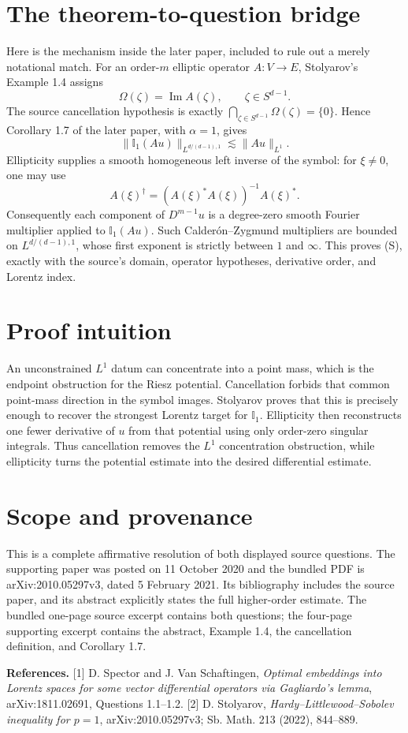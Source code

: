 \documentclass[11pt]{article}
\newcommand{\I}{\mathbb I}
\begin{document}
\section*{The theorem-to-question bridge}

Here is the mechanism inside the later paper, included to rule out a merely
notational match.  For an order-$m$ elliptic operator $A:V\to E$, Stolyarov's
Example 1.4 assigns
\[
 \Omega(\zeta)=\operatorname{Im}A(\zeta),\qquad \zeta\in S^{d-1}.
\]
The source cancellation hypothesis is exactly
$\bigcap_{\zeta\in S^{d-1}}\Omega(\zeta)=\{0\}$.  Hence Corollary 1.7 of
the later paper, with $\alpha=1$, gives
\[
 \|\I_1(Au)\|_{L^{d/(d-1),1}}
 \lesssim \|Au\|_{L^1}.
\]
Ellipticity supplies a smooth homogeneous left inverse of the symbol:
for $\xi\ne0$, one may use
\[
 A(\xi)^\dagger=(A(\xi)^*A(\xi))^{-1}A(\xi)^*.
\]
Consequently each component of $D^{m-1}u$ is a degree-zero smooth Fourier
multiplier applied to $\I_1(Au)$.  Such Calder\'on--Zygmund multipliers are
bounded on $L^{d/(d-1),1}$, whose first exponent is strictly between $1$
and $\infty$.  This proves (S), exactly with the source's domain, operator
hypotheses, derivative order, and Lorentz index.

\section*{Proof intuition}

An unconstrained $L^1$ datum can concentrate into a point mass, which is the
endpoint obstruction for the Riesz potential.  Cancellation forbids that
common point-mass direction in the symbol images.  Stolyarov proves that this
is precisely enough to recover the strongest Lorentz target for $\I_1$.
Ellipticity then reconstructs one fewer derivative of $u$ from that potential
using only order-zero singular integrals.  Thus cancellation removes the
$L^1$ concentration obstruction, while ellipticity turns the potential
estimate into the desired differential estimate.

\section*{Scope and provenance}

This is a complete affirmative resolution of both displayed source
questions.  The supporting paper was posted on 11 October 2020 and the
bundled PDF is arXiv:2010.05297v3, dated 5 February 2021.  Its bibliography
includes the source paper, and its abstract explicitly states the full
higher-order estimate.  The bundled one-page source excerpt contains both
questions; the four-page supporting excerpt contains the abstract, Example
1.4, the cancellation definition, and Corollary 1.7.

{\small
\textbf{References.}
[1] D. Spector and J. Van Schaftingen, \emph{Optimal embeddings into Lorentz
spaces for some vector differential operators via Gagliardo's lemma},
arXiv:1811.02691, Questions 1.1--1.2.
[2] D. Stolyarov, \emph{Hardy--Littlewood--Sobolev inequality for $p=1$},
arXiv:2010.05297v3; Sb. Math. 213 (2022), 844--889.
}
\end{document}
